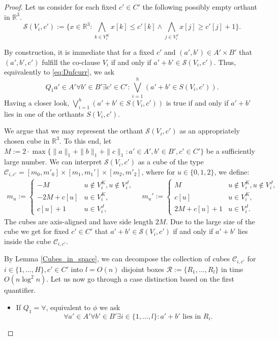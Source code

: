 \begin{proof}
  Let us consider for each fixed $c' \in C'$ the following possibly empty orthant in $\mathbb{R}^3$.
  $$\mathcal{S}(V_{i},c'):=\{x \in \mathbb{R}^3 : \bigwedge_{k \in V_i^K}x[k] \leq c'[k] \land \bigwedge_{j \in V_i^J}x[j] \geq c'[j]+1   \}.$$

  By construction, it is immediate that for a fixed $c'$  and $(a',b') \in A' \times B'$ that $(a',b',c')$ fulfill the co-clause $V_i $ if and only if $a'+b' \in \mathcal{S}(V_{i},c')$.
  Thus, equivalently to \eqref{eq:Dnfcurr}, we ask
	\[ Q_1 a' \in A' \forall b' \in B' \exists c' \in C': \bigvee_{i=1}^{h} \left( a'+b' \in S(V_i,c') \right).\]
  Having a closer look, $\bigvee_{i=1}^{h} \left( a'+b' \in S(V_i,c') \right)$ is true if and only if $a'+b'$ lies in one of the orthants $S(V_i,c')$.

	We argue that we may represent the orthant $ \mathcal{S}(V_{i},c')$ as an appropriately chosen cube in $\mathbb{R}^3$. To this end, let $M:=2 \cdot \max \{\|a \|_1+ \|b \|_1+ \|c \|_1: a' \in A', b' \in B', c' \in C'\}$ be a sufficiently large number. We can interpret $\mathcal{S}(V_{i},c')$ as a cube of the type $\mathcal{C}_{i,c'} = [m_0,m'_0] \times [m_1,m_1'] \times [m_2,m'_2]$,
  where for $u \in \{0,1,2\}$, we define:
  \begin{align*}
  m_u:=\begin{cases} 
    -M & u \not \in V_i^K , u \not \in V_i^J,\\
    -2M+c[u] & u \in V_i^K, \\
    c[u]+1 & u \in V_i^J,
 \end{cases} \quad   m_{u}' := \begin{cases} 
  M & u \not \in V_i^K , u \not \in V_i^J,\\
  c[u] & u \in V_i^K, \\
  2M+c[u]+1 & u \in V_i^J. 
\end{cases}
\end{align*}
The cubes are axis-aligned and have side length $2M$. Due to the large size of the cube we get for fixed $c' \in C'$ that
$a'+b' \in \mathcal{S}(V_i,c')$ if and only if $a'+b'$ lies inside the cube $\mathcal{C}_{i,c'}$.

By Lemma \ref{Cubes_in_space}, we can decompose the collection of cubes $\mathcal{C}_{i,c'}$ for $i \in \{1,\dots,H \}, c' \in C'$ into $l = O(n)$ disjoint boxes $\mathcal{R}:=\{R_1, \dots, R_l\}$ in time $O( n \log^2 n)$.
Let us now go through a case distinction based on the first quantifier. 
  \begin{itemize}
  \item If $Q_1=\forall$, equivalent to $\phi$ we ask 
  $$\forall a' \in A' \forall b' \in B' \exists i \in \{1,\dots,l\}: a'+b' \text{ lies in } R_i.$$
  

\end{itemize}
\end{proof}
